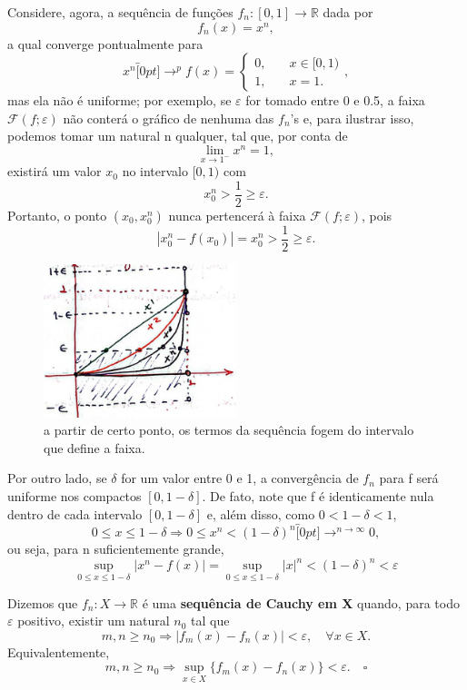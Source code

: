 \documentclass[../analysisII_notes.tex]{subfiles}
\begin{document}
\begin{example}
	Considere, agora, a sequência de funções \(f_{n}:[0, 1]\rightarrow \mathbb{R}\) dada por
	\[
		f_{n}(x)=x^{n},
	\]
	a qual converge pontualmente para
	\[
		x^{n}\overbracket[0pt]{\rightarrow}^{p} f(x)= \left\{\begin{array}{ll}
			0, & \quad x\in [0,1) \\
			1, & \quad x=1.
		\end{array}\right.,
	\]
	mas ela não é uniforme; por exemplo, se \(\varepsilon \) for tomado entre 0 e 0.5, a faixa \(\mathcal{F}(f;\varepsilon )\) não conterá o gráfico de nenhuma das \(f_{n}\)'s e,  para ilustrar isso, podemos tomar um natural n qualquer, tal que, por conta de
	\[
		\lim_{x\to 1^{-}}x^{n}=1,
	\]
	existirá um valor \(x_{0}\) no intervalo \([0, 1)\) com
	\[
		x_{0}^{n}>\frac{1}{2}\geq \varepsilon .
	\]
	Portanto, o ponto \((x_{0}, x_{0}^{n})\) nunca pertencerá à faixa \(\mathcal{F}(f;\varepsilon )\), pois
	\[
		|x_{0}^{n}-f(x_{0})|=x_{0}^{n}>\frac{1}{2}\geq \varepsilon .
	\]
	\begin{figure}[H]
		\begin{center}
			\includegraphics[height=0.5\textheight, width=0.5\textwidth, keepaspectratio]{./Images/xn_16.png}
		\end{center}
		\caption{a partir de certo ponto, os termos da sequência fogem do intervalo que define a faixa.}
	\end{figure}

	Por outro lado, se \(\delta \) for um valor entre 0 e 1, a convergência de \(f_{n}\) para f será uniforme nos compactos \([0, 1-\delta ]\). De fato, note que f é identicamente nula dentro de cada intervalo \([0, 1-\delta ]\) e, além disso, como \(0<1-\delta <1\),
	\[
		0\leq x\leq 1-\delta \Rightarrow 0\leq x^{n}<(1-\delta )^{n}\overbracket[0pt]{\longrightarrow}^{n\to \infty}0,
	\]
	ou seja, para n suficientemente grande,
	\[
		\sup_{0\leq x\leq 1-\delta }|x^{n}-f(x)|=\sup_{0\leq x\leq 1-\delta }|x|^{n}<(1-\delta )^{n}<\varepsilon
	\]
\end{example}

\begin{def*}
	Dizemos que \(f_{n}:X\rightarrow \mathbb{R}\) é uma \textbf{sequência de Cauchy em X} quando, para todo \(\varepsilon \) positivo, existir um natural \(n_{0}\) tal que
	\[
		m, n\geq n_{0} \Rightarrow |f_{m}(x)-f_{n}(x)|<\varepsilon ,\quad \forall x\in X.
	\]
	Equivalentemente,
	\[
		m, n\geq n_{0} \Rightarrow \sup_{x\in X}\{f_{m}(x)-f_{n}(x)\}<\varepsilon .\quad \square
	\]
\end{def*}
\end{document}
